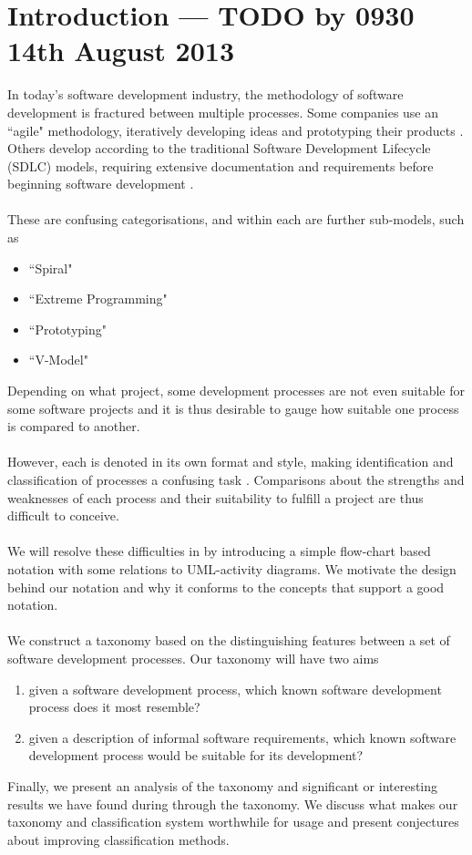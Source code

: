 \section{Introduction --- TODO by 0930 14th August 2013} \label{introduction}

In today's software development industry, the methodology of software development is fractured
between multiple processes.
Some companies use an ``agile" methodology, iteratively developing ideas and prototyping their
products \FIXME. %
Others develop according to the traditional Software Development Lifecycle (SDLC) models, requiring
extensive documentation and requirements before beginning software development \FIXME.\\
\\
These are confusing categorisations, and within each are further sub-models, such as \FIXME
\begin{itemize}
	\item ``Spiral"
	\item ``Extreme Programming"
	\item ``Prototyping"
	\item ``V-Model"
\end{itemize}
Depending on what project, some development processes are not even suitable for some software
projects and it is thus desirable to gauge how suitable one process is compared to another.\\
\\
However, each is denoted in its own format and style, making identification and classification of processes a
confusing task \FIXME. %
Comparisons about the strengths and weaknesses of each process and their suitability to fulfill a
project are thus difficult to conceive.\\
\\
We will resolve these difficulties in by introducing a simple flow-chart based notation with some
relations to UML-activity diagrams.
We motivate the design behind our notation and why it conforms to the concepts that support a good
notation.\\
\\
We construct a taxonomy based on the distinguishing features between a set of software development
processes.
Our taxonomy will have two aims
\begin{enumerate}
	\item given a software development process, which known software development process does it most
	resemble?
	\item given a description of informal software requirements, which known software development
	process would be suitable for its development?
\end{enumerate}

Finally, we present an analysis of the taxonomy and significant or interesting results we have
found during through the taxonomy.
We discuss what makes our taxonomy and classification system worthwhile for usage and present
conjectures about improving classification methods.
